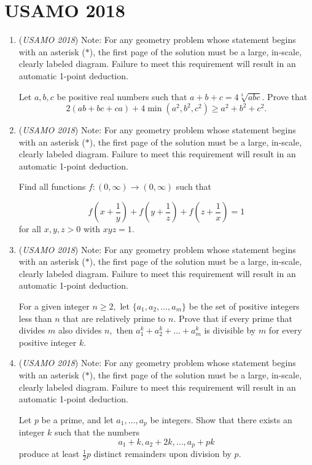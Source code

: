 \section{USAMO 2018}
        \begin{enumerate}
        	\item (\textit{USAMO 2018}) Note: For any geometry problem whose statement begins with an asterisk ($*$), the first page of the solution must be a large, in-scale, clearly labeled diagram. Failure to meet this requirement will result in an automatic 1-point deduction.


 Let $a,b,c$ be positive real numbers such that $a+b+c=4\sqrt[3]{abc}$. Prove that 
 \[2(ab+bc+ca)+4\min(a^2,b^2,c^2)\ge a^2+b^2+c^2.\]


	\item (\textit{USAMO 2018}) Note: For any geometry problem whose statement begins with an asterisk ($*$), the first page of the solution must be a large, in-scale, clearly labeled diagram. Failure to meet this requirement will result in an automatic 1-point deduction.


 Find all functions $f:(0,\infty) \rightarrow (0,\infty)$ such that


 
 \[f\left(x+\frac{1}{y}\right)+f\left(y+\frac{1}{z}\right) + f\left(z+\frac{1}{x}\right) = 1\]
for all $x,y,z >0$ with $xyz =1.$


	\item (\textit{USAMO 2018}) Note: For any geometry problem whose statement begins with an asterisk ($*$), the first page of the solution must be a large, in-scale, clearly labeled diagram. Failure to meet this requirement will result in an automatic 1-point deduction.


 For a given integer $n\ge 2,$ let $\{a_1,a_2,\ldots,a_m\}$ be the set of positive integers less than $n$ that are relatively prime to $n.$ Prove that if every prime that divides $m$ also divides $n,$ then $a_1^k+a_2^k + \dots + a_m^k$ is divisible by $m$ for every positive integer $k.$


	\item (\textit{USAMO 2018}) Note: For any geometry problem whose statement begins with an asterisk ($*$), the first page of the solution must be a large, in-scale, clearly labeled diagram. Failure to meet this requirement will result in an automatic 1-point deduction.


 Let $p$ be a prime, and let $a_1, \dots, a_p$ be integers. Show that there exists an integer $k$ such that the numbers 
 \[a_1 + k, a_2 + 2k, \dots, a_p + pk\]produce at least $\frac{1}{2} p$ distinct remainders upon division by $p$.



\end{enumerate}
